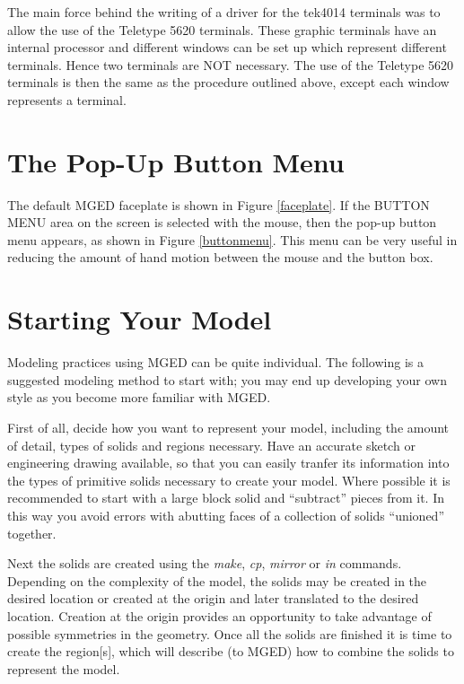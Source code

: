 The main force behind the writing of a driver for the tek4014 terminals
was to allow the use of the Teletype 5620 terminals.
These graphic terminals have an internal processor and different windows
can be set up which represent different terminals.
Hence two terminals are NOT necessary.
The use of the Teletype 5620 terminals is then the same as the procedure
outlined above, except each window represents a terminal.

\section{The Pop-Up Button Menu}

The default MGED faceplate is shown in Figure \ref{faceplate}.
If the BUTTON MENU area on the screen is selected with the mouse,
then the pop-up button menu appears, as shown in Figure \ref{buttonmenu}.
This menu can be very useful in reducing the amount of hand motion
between the mouse and the button box.

\section{Starting Your Model}

Modeling practices using MGED can be quite individual.  The following is a
suggested modeling method to start with; you may end up developing your own
style as you become more familiar with MGED.

First of all, decide how you want to represent your model, including the
amount of detail, types of solids and regions necessary.  Have an accurate
sketch or engineering drawing available, so that you can easily tranfer its
information into the types of primitive solids necessary to create your model.
Where possible it is recommended to start with a large block solid and
``subtract'' pieces from it.  In this way you avoid errors with abutting
faces of a collection of solids ``unioned'' together.

Next the solids are created using the
{\em make}, {\em cp}, {\em mirror} or {\em in}
commands.  Depending on the complexity of the model, the solids may be
created in the desired location or created at the origin and later
translated to the desired location.  Creation at the origin provides
an opportunity to take advantage of possible symmetries in the geometry.
Once all the solids are finished it is time to create the region[s],
which will describe (to MGED) how to combine the solids to represent
the model.

